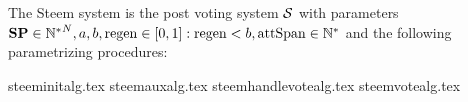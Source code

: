\begin{definition}
  The Steem system is the post voting system $\mathcal{S}$ with parameters $\mathrm{\textbf{SP}}
  \in {\mathbb{N}^*}^N, a, b, \mathrm{regen} \in \left[0, 1\right]: \mathrm{regen} < b, \mathrm{attSpan}
  \in \mathbb{N}^*$ and the following parametrizing procedures:
\end{definition}
{steeminitalg.tex}
{steemauxalg.tex}
{steemhandlevotealg.tex}
{steemvotealg.tex}
